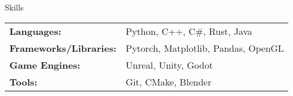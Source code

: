 \documentclass{resume} %
\begin{document}
\begin{rSection}{Skills}
    \begin{tabular}{>{\bfseries}l l} %
        \small Languages: & Python, C++, C\#, Rust, Java \\
        \small Frameworks/Libraries: & Pytorch, Matplotlib, Pandas, OpenGL \\
        \small Game Engines: & Unreal, Unity, Godot \\
        \small Tools: & Git, CMake, Blender \\
    \end{tabular}
\end{rSection}
\end{document}
